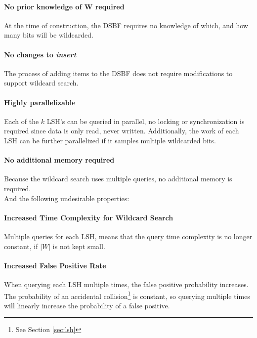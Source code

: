 \documentclass[a4paper,11pt]{article}
\begin{document}
\paragraph{No prior knowledge of W required} At the time of construction, the DSBF requires no knowledge of which, and how many bits will be wildcarded.

\paragraph{No changes to \emph{insert}} The process of adding items to the DSBF does not require modifications to support wildcard search.

\paragraph{Highly parallelizable} Each of the $k$ LSH's can be queried in parallel, no locking or synchronization is required since data is only read, never written. Additionally, the work of each LSH can be further parallelized if it samples multiple wildcarded bits.

\paragraph{No additional memory required} Because the wildcard search uses multiple queries, no additional memory is required.
\\

And the following undesirable properties:
\paragraph{Increased Time Complexity for Wildcard Search} Multiple queries for each LSH, means that the query time complexity is no longer constant, if $|W|$ is not kept small.

\paragraph{Increased False Positive Rate} When querying each LSH multiple times, the false positive probability increases. The probability of an accidental collision\footnote{See Section \ref{sec:lsh}} is constant, so querying multiple times will linearly increase the probability of a false positive.
\end{document}
